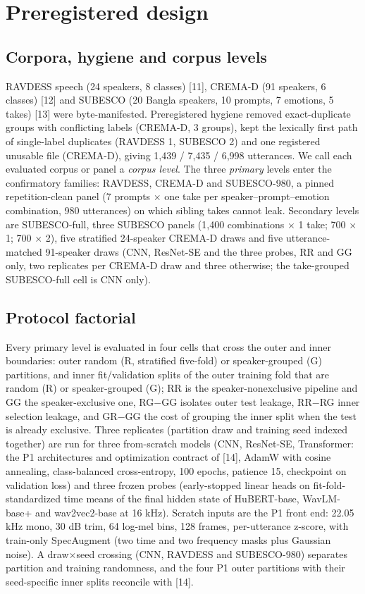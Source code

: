 \documentclass{article}
\begin{document}
\section{Preregistered design}

\subsection{Corpora, hygiene and corpus levels}
RAVDESS speech (24 speakers, 8 classes) [11], CREMA-D (91 speakers, 6 classes) [12] and SUBESCO (20 Bangla speakers, 10 prompts, 7 emotions, 5 takes) [13] were byte-manifested.
Preregistered hygiene removed exact-duplicate groups with conflicting labels (CREMA-D, 3 groups), kept the lexically first path of single-label duplicates (RAVDESS 1, SUBESCO 2) and one registered unusable file (CREMA-D), giving 1,439 / 7,435 / 6,998 utterances.
We call each evaluated corpus or panel a \emph{corpus level}.
The three \emph{primary} levels enter the confirmatory families: RAVDESS, CREMA-D and SUBESCO-980, a pinned repetition-clean panel (7 prompts $\times$ one take per speaker--prompt--emotion combination, 980 utterances) on which sibling takes cannot leak.
Secondary levels are SUBESCO-full, three SUBESCO panels (1,400 combinations $\times$ 1 take; 700 $\times$ 1; 700 $\times$ 2), five stratified 24-speaker CREMA-D draws and five utterance-matched 91-speaker draws (CNN, ResNet-SE and the three probes, RR and GG only, two replicates per CREMA-D draw and three otherwise; the take-grouped SUBESCO-full cell is CNN only).

\subsection{Protocol factorial}
Every primary level is evaluated in four cells that cross the outer and inner boundaries: outer random (R, stratified five-fold) or speaker-grouped (G) partitions, and inner fit/validation splits of the outer training fold that are random (R) or speaker-grouped (G); RR is the speaker-nonexclusive pipeline and GG the speaker-exclusive one, RG$-$GG isolates outer test leakage, RR$-$RG inner selection leakage, and GR$-$GG the cost of grouping the inner split when the test is already exclusive.
Three replicates (partition draw and training seed indexed together) are run for three from-scratch models (CNN, ResNet-SE, Transformer: the P1 architectures and optimization contract of [14], AdamW with cosine annealing, class-balanced cross-entropy, 100 epochs, patience 15, checkpoint on validation loss) and three frozen probes (early-stopped linear heads on fit-fold-standardized time means of the final hidden state of HuBERT-base, WavLM-base+ and wav2vec2-base at 16 kHz).
Scratch inputs are the P1 front end: 22.05 kHz mono, 30 dB trim, 64 log-mel bins, 128 frames, per-utterance z-score, with train-only SpecAugment (two time and two frequency masks plus Gaussian noise).
A draw$\times$seed crossing (CNN, RAVDESS and SUBESCO-980) separates partition and training randomness, and the four P1 outer partitions with their seed-specific inner splits reconcile with [14].
\end{document}
